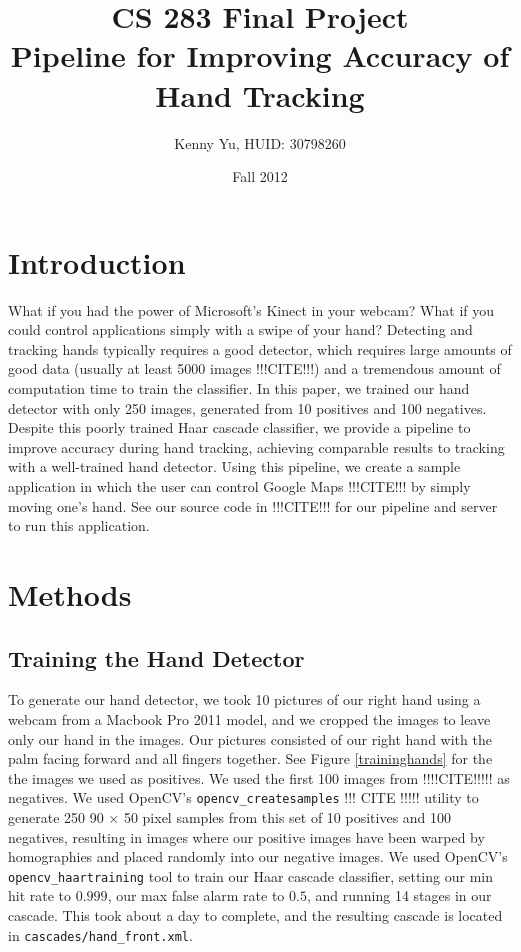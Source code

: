 \documentclass[12pt]{article}
\begin{document}
\title{CS 283 Final Project \\ Pipeline for Improving Accuracy of Hand Tracking}
\date{Fall 2012}
\author{Kenny Yu, HUID: 30798260}
\maketitle

\section{Introduction}
What if you had the power of Microsoft's Kinect in your webcam? What if you could control applications simply with a swipe of your hand? Detecting and tracking hands typically requires a good detector, which requires large amounts of good data (usually at least 5000 images !!!CITE!!!) and a tremendous amount of computation time to train the classifier. In this paper, we trained our hand detector with only 250 images, generated from 10 positives and 100 negatives. Despite this poorly trained Haar cascade classifier, we provide a pipeline to improve accuracy during hand tracking, achieving comparable results to tracking with a well-trained hand detector. Using this pipeline, we create a sample application in which the user can control Google Maps !!!CITE!!! by simply moving one's hand. See our source code in !!!CITE!!! for our pipeline and server to run this application.

\section{Methods}

\subsection{Training the Hand Detector}
To generate our hand detector, we took 10 pictures of our right hand using a webcam from a  Macbook Pro 2011 model, and we cropped the images to leave only our hand in the images. Our pictures consisted of our right hand with the palm facing forward and all fingers together. See Figure \ref{traininghands} for the the images we used as positives. We used the first 100 images from !!!!CITE!!!!! as negatives. We used OpenCV's \texttt{opencv\_createsamples} !!! CITE !!!!! utility to generate 250 90 $\times$ 50 pixel samples from this set of 10 positives and 100 negatives, resulting in images where our positive images have been warped by homographies and placed randomly into our negative images. We used OpenCV's \texttt{opencv\_haartraining} tool to train our Haar cascade classifier, setting our min hit rate to $0.999$, our max false alarm rate to $0.5$, and running 14 stages in our cascade. This took about a day to complete, and the resulting cascade is located in \texttt{cascades/hand\_front.xml}.
\end{document}
